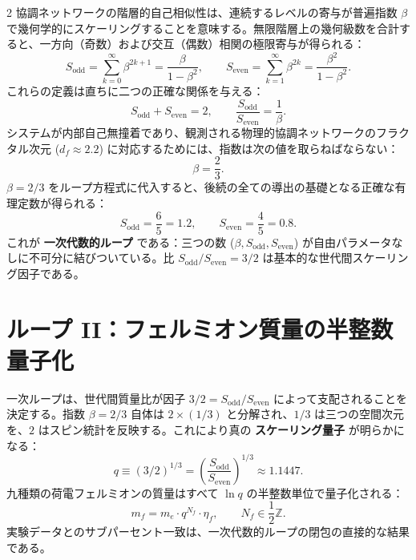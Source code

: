 \documentclass[12pt,a4paper]{article}
\begin{document}
\begin{multicols}{2}
		協調ネットワークの階層的自己相似性は、連続するレベルの寄与が普遍指数 \(\beta\) で幾何学的にスケーリングすることを意味する。無限階層上の幾何級数を合計すると、一方向（奇数）および交互（偶数）相関の極限寄与が得られる：
		\begin{equation}
			S_{\mathrm{odd}} = \sum_{k=0}^{\infty} \beta^{2k+1} = \frac{\beta}{1-\beta^{2}}, \qquad
			S_{\mathrm{even}} = \sum_{k=1}^{\infty} \beta^{2k} = \frac{\beta^{2}}{1-\beta^{2}}.
		\end{equation}
		これらの定義は直ちに二つの正確な関係を与える：
		\begin{equation}
			S_{\mathrm{odd}} + S_{\mathrm{even}} = 2, \qquad \frac{S_{\mathrm{odd}}}{S_{\mathrm{even}}} = \frac{1}{\beta}.
		\end{equation}
		システムが内部自己無撞着であり、観測される物理的協調ネットワークのフラクタル次元 (\(d_f \approx 2.2\)) に対応するためには、指数は次の値を取らねばならない：
		\begin{equation}
			\boxed{\beta = \frac{2}{3}}.
		\end{equation}
		\(\beta = 2/3\) をループ方程式に代入すると、後続の全ての導出の基礎となる正確な有理定数が得られる：
		\begin{equation}
			\boxed{S_{\mathrm{odd}} = \frac{6}{5} = 1.2, \qquad S_{\mathrm{even}} = \frac{4}{5} = 0.8.}
		\end{equation}
		これが \textbf{一次代数的ループ} である：三つの数 (\(\beta, S_{\mathrm{odd}}, S_{\mathrm{even}}\)) が自由パラメータなしに不可分に結びついている。比 \(S_{\mathrm{odd}}/S_{\mathrm{even}} = 3/2\) は基本的な世代間スケーリング因子である。
		
		\section{ループ II：フェルミオン質量の半整数量子化}
		
		一次ループは、世代間質量比が因子 \(3/2 = S_{\mathrm{odd}}/S_{\mathrm{even}}\) によって支配されることを決定する。指数 \(\beta = 2/3\) 自体は \(2 \times (1/3)\) と分解され、\(1/3\) は三つの空間次元を、\(2\) はスピン統計を反映する。これにより真の \textbf{スケーリング量子} が明らかになる：
		\begin{equation}
			q \equiv (3/2)^{1/3} = \left( \frac{S_{\mathrm{odd}}}{S_{\mathrm{even}}} \right)^{1/3} \approx 1.1447.
		\end{equation}
		九種類の荷電フェルミオンの質量はすべて \(\ln q\) の半整数単位で量子化される：
		\begin{equation}
			m_f = m_e \cdot q^{N_f} \cdot \eta_f, \qquad N_f \in \frac{1}{2}\mathbb{Z}.
		\end{equation}
		実験データとのサブパーセント一致は、一次代数的ループの閉包の直接的な結果である。
		

\end{multicols}
\end{document}
